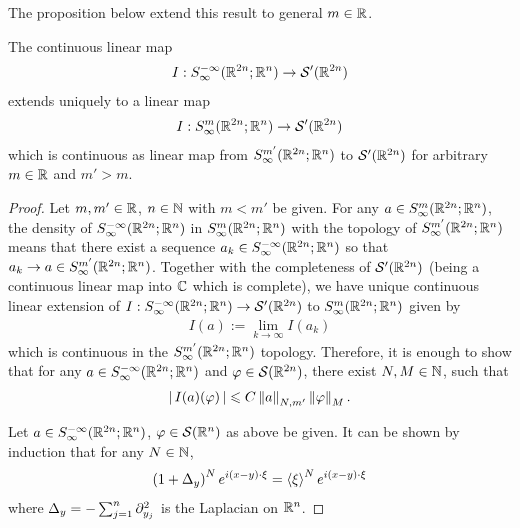 \documentclass[12pt]{article}
\begin{document}
The proposition below extend this result to general $m \in \R$. 
\begin{fprop} \label{prop : quantisation of all order}
    The continuous linear map 
    \begin{align*}
        I : S^{-\infty}_\infty(\R^{2n}; \R^n) \to \sch'(\R^{2n}) \\
    \end{align*}
    extends uniquely to a linear map 
    \begin{align*}
        I: S^{m}_\infty(\R^{2n}; \R^n) \to \sch'(\R^{2n})
    \end{align*}
    which is continuous as linear map from $S^{m'}_\infty(\R^{2n}; \R^n)$ to $\sch'(\R^{2n})$ for arbitrary $m \in \R$ and $m ' > m$. 
\end{fprop}
\begin{proof}
    Let $m, m' \in \R$, $n \in \N$ with $m < m' $ be given. For any $a \in S^{m}_\infty(\R^{2n}; \R^n)$, the density of $S^{-\infty}_\infty(\R^{2n}; \R^n)$ in  $S^{m}_\infty(\R^{2n}; \R^n)$ with the topology of $S^{m'}_\infty(\R^{2n}; \R^n)$ means that there exist a sequence $a_k \in S^{-\infty}_\infty(\R^{2n}; \R^n)$ so that $a_k \to a \in S^{m'}_\infty(\R^{2n}; \R^n)$. Together with the completeness of $\sch'(\R^{2n})$ (being a continuous linear map into $\C$ which is complete), we have unique continuous linear extension of $I : S^{-\infty}_\infty(\R^{2n}; \R^n) \to \sch'(\R^{2n})$ to $S^{m}_\infty(\R^{2n}; \R^n)$ given by
    \begin{align*}
        I(a) := \lim_{k \to \infty}I(a_k)
    \end{align*}
    which is continuous in the $S^{m'}_\infty(\R^{2n}; \R^n)$ topology. Therefore, it is enough to show that for any $a \in S^{-\infty}_\infty(\R^{2n}; \R^n) $ and $\varphi \in \sch(\R^{2n})$, there exist $N, M \in \N$, such that 
    \begin{align*}
        \abs{I(a)(\varphi)} \leq C \norm[a]_{N, m'} \norm[\varphi]_M. 
    \end{align*}
    
    Let $a \in S^{-\infty}_{\infty}(\R^{2n}; \R^{n})$, $\varphi \in \sch(\R^n)$ as above be given. It can be shown by induction that for any $N \in \N$,  
    \begin{align*}
    \brac{1 + \Delta_y}^N e^{i (x - y) \cdot \xi} = \sym[\xi]^{N}e^{i (x - y) \cdot \xi}
    \end{align*}
    where $\Delta_y = - \sum_{j = 1}^n \p_{y_j}^2$ is the Laplacian on $\R^n$. 


\end{proof}
\end{document}
